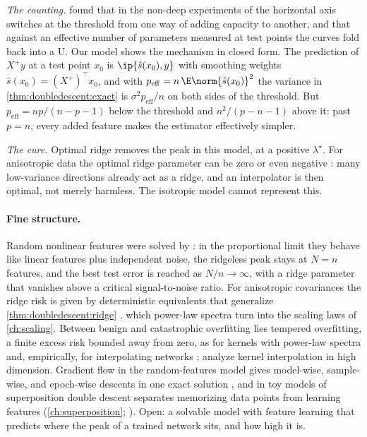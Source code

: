 \begin{refsection}
\emph{The counting.} \Textcite{CurthEtAl2023} found that in the non-deep experiments of \textcite{BelkinEtAl2019} the horizontal axis switches at the threshold from one way of adding capacity to another, and that against an effective number of parameters measured at test points the curves fold back into a U. Our model shows the mechanism in closed form. The prediction of $X^+y$ at a test point $x_0$ is $\ip{\hat s(x_0),y}$ with smoothing weights $\hat s(x_0)=(X^+)^\top x_0$, and with $p_{\mathrm{eff}}=n\,\E\norm{\hat s(x_0)}^2$ the variance in \cref{thm:doubledescent:exact} is $\sigma^2p_{\mathrm{eff}}/n$ on both sides of the threshold. But $p_{\mathrm{eff}}=np/(n-p-1)$ below the threshold and $n^2/(p-n-1)$ above it: past $p=n$, every added feature makes the estimator effectively simpler.

\emph{The cure.} Optimal ridge removes the peak in this model, at a positive $\lambda^\star$. For anisotropic data the optimal ridge parameter can be zero or even negative \parencite{KobakEtAl2020,TsiglerBartlett2023}: many low-variance directions already act as a ridge, and an interpolator is then optimal, not merely harmless. The isotropic model cannot represent this.

\paragraph{Fine structure.} Random nonlinear features were solved by \textcite{MeiMontanari2022}: in the proportional limit they behave like linear features plus independent noise, the ridgeless peak stays at $N=n$ features, and the best test error is reached as $N/n\to\infty$, with a ridge parameter that vanishes above a critical signal-to-noise ratio. For anisotropic covariances the ridge risk is given by deterministic equivalents that generalize \cref{thm:doubledescent:ridge} \parencite{HastieEtAl2022,AtanasovEtAl2026}, which power-law spectra turn into the scaling laws of \cref{ch:scaling}. Between benign and catastrophic overfitting lies tempered overfitting, a finite excess risk bounded away from zero, as for kernels with power-law spectra and, empirically, for interpolating networks \parencite{MallinarEtAl2022}; \textcite{LiangRakhlin2020} analyze kernel interpolation in high dimension. Gradient flow in the random-features model gives model-wise, sample-wise, and epoch-wise descents in one exact solution \parencite{BodinMacris2021}, and in toy models of superposition double descent separates memorizing data points from learning features (\cref{ch:superposition}; \cite{HenighanEtAl2023}). Open: a solvable model with feature learning that predicts where the peak of a trained network sits, and how high it is.


\end{refsection}
